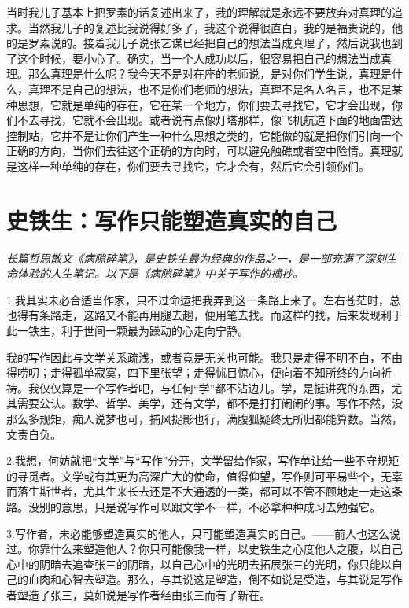 \documentclass[fontset=fandol,12pt,a5paper]{ctexbook}
\begin{document}
当时我儿子基本上把罗素的话复述出来了，我的理解就是永远不要放弃对真理的追求。当然我儿子的复述比我说得好多了，我这个说得很直白，我的是福贵说的，他的是罗素说的。接着我儿子说张艺谋已经把自己的想法当成真理了，然后说我也到了这个时候，要小心了。确实，当一个人成功以后，很容易把自己的想法当成真理。那么真理是什么呢？我今天不是对在座的老师说，是对你们学生说，真理是什么，真理不是自己的想法，也不是你们老师的想法，真理不是名人名言，也不是某种思想，它就是单纯的存在，它在某一个地方，你们要去寻找它，它才会出现，你们不去寻找，它就不会出现。或者说有点像灯塔那样，像飞机航道下面的地面雷达控制站，它并不是让你们产生一种什么思想之类的，它能做的就是把你们引向一个正确的方向，当你们去往这个正确的方向时，可以避免触礁或者空中险情。真理就是这样一种单纯的存在，你们要去寻找它，它才会有，然后它会引领你们。

\newpage

\section{史铁生：写作只能塑造真实的自己}

\emph{长篇哲思散文《病隙碎笔》，是史铁生最为经典的作品之一，是一部充满了深刻生命体验的人生笔记。以下是《病隙碎笔》中关于写作的摘抄。}
\vspace{2em}

1.我其实未必合适当作家，只不过命运把我弄到这一条路上来了。左右苍茫时，总也得有条路走，这路又不能再用腿去趟，便用笔去找。而这样的找，后来发现利于此一铁生，利于世间一颗最为躁动的心走向宁静。

我的写作因此与文学关系疏浅，或者竟是无关也可能。我只是走得不明不白，不由得唠叨；走得孤单寂寞，四下里张望；走得怵目惊心，便向着不知所终的方向祈祷。我仅仅算是一个写作者吧，与任何“学”都不沾边儿。学，是挺讲究的东西，尤其需要公认。数学、哲学、美学，还有文学，都不是打打闹闹的事。写作不然，没那么多规矩，痴人说梦也可，捕风捉影也行，满腹狐疑终无所归都能算数。当然，文责自负。

2.我想，何妨就把“文学”与“写作”分开，文学留给作家，写作单让给一些不守规矩的寻觅者。文学或有其更为高深广大的使命，值得仰望，写作则可平易些个，无辜而落生斯世者，尤其生来长去还是不大通透的一类，都可以不管不顾地走一走这条路。没别的意思，只是说写作可以跟文学不一样，不必拿种种成习去勉强它。

3.写作者，未必能够塑造真实的他人，只可能塑造真实的自己。——前人也这么说过。你靠什么来塑造他人？你只可能像我一样，以史铁生之心度他人之腹，以自己心中的阴暗去追查张三的阴暗，以自己心中的光明去拓展张三的光明，你只能以自己的血肉和心智去塑造。那么，与其说这是塑造，倒不如说是受造，与其说是写作者塑造了张三，莫如说是写作者经由张三而有了新在。
\end{document}
